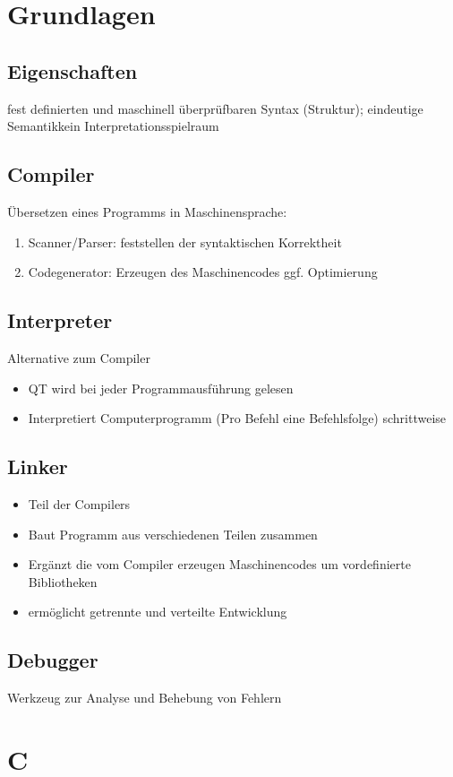 \documentclass[10pt,a5paper]{article}
\author{Christian Böhm}
\begin{document}
\section{Grundlagen}
\subsection{Eigenschaften}
 fest definierten und maschinell überprüfbaren Syntax (Struktur); eindeutige Semantik\subitem kein Interpretationsspielraum
\subsection{Compiler} Übersetzen eines Programms in Maschinensprache:
\begin{enumerate}
\item Scanner/Parser: feststellen der syntaktischen Korrektheit
\item Codegenerator: Erzeugen des Maschinencodes ggf. Optimierung
\end{enumerate} 
\subsection{Interpreter}
Alternative zum Compiler
\begin{itemize}
\item QT wird bei jeder Programmausführung gelesen
\item Interpretiert Computerprogramm (Pro Befehl eine Befehlsfolge) schrittweise
\end{itemize}
\subsection{Linker}
\begin{itemize}
\item Teil der Compilers
\item Baut Programm aus verschiedenen Teilen zusammen
\item Ergänzt die vom Compiler erzeugen Maschinencodes um vordefinierte Bibliotheken
\item ermöglicht getrennte und verteilte Entwicklung
\end{itemize}
\subsection{Debugger}
Werkzeug zur Analyse und Behebung von Fehlern
\newpage \section{C}
\end{document}
